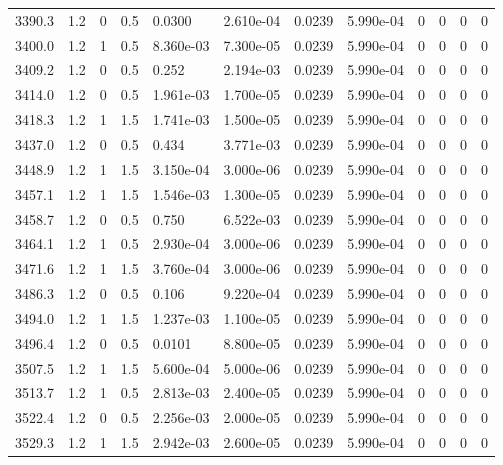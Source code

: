 \documentclass[preview]{standalone}
\begin{document}
{{{{{{{{{{{{{{\begin{tabular}{L{1.2cm}C{1.2cm} C{0.3cm}C{0.5cm} C{1.4cm}C{1.4cm} C{1.4cm}C{1.4cm} C{1.6cm}C{1.6cm} C{1.6cm}C{1.6cm}}
  3390.3  &   1.2  & 0     & 0.5 &  0.0300  & 2.610e-04  &  0.0239&   5.990e-04& 0 & 0   &  0 & 0  \\ 
  3400.0  &   1.2  & 1     & 0.5 &  8.360e-03  & 7.300e-05  &  0.0239&   5.990e-04& 0 & 0   &  0 & 0  \\ 
  3409.2  &   1.2  & 0     & 0.5 &  0.252  & 2.194e-03  &  0.0239&   5.990e-04& 0 & 0   &  0 & 0  \\ 
  3414.0  &   1.2  & 0     & 0.5 &  1.961e-03  & 1.700e-05  &  0.0239&   5.990e-04& 0 & 0   &  0 & 0  \\ 
  3418.3  &   1.2  & 1     & 1.5 &  1.741e-03  & 1.500e-05  &  0.0239&   5.990e-04& 0 & 0   &  0 & 0  \\ 
  3437.0  &   1.2  & 0     & 0.5 &  0.434  & 3.771e-03  &  0.0239&   5.990e-04& 0 & 0   &  0 & 0  \\ 
  3448.9  &   1.2  & 1     & 1.5 &  3.150e-04  & 3.000e-06  &  0.0239&   5.990e-04& 0 & 0   &  0 & 0  \\ 
  3457.1  &   1.2  & 1     & 1.5 &  1.546e-03  & 1.300e-05  &  0.0239&   5.990e-04& 0 & 0   &  0 & 0  \\ 
  3458.7  &   1.2  & 0     & 0.5 &  0.750  & 6.522e-03  &  0.0239&   5.990e-04& 0 & 0   &  0 & 0  \\ 
  3464.1  &   1.2  & 1     & 0.5 &  2.930e-04  & 3.000e-06  &  0.0239&   5.990e-04& 0 & 0   &  0 & 0  \\ 
  3471.6  &   1.2  & 1     & 1.5 &  3.760e-04  & 3.000e-06  &  0.0239&   5.990e-04& 0 & 0   &  0 & 0  \\ 
  3486.3  &   1.2  & 0     & 0.5 &  0.106  & 9.220e-04  &  0.0239&   5.990e-04& 0 & 0   &  0 & 0  \\ 
  3494.0  &   1.2  & 1     & 1.5 &  1.237e-03  & 1.100e-05  &  0.0239&   5.990e-04& 0 & 0   &  0 & 0  \\ 
  3496.4  &   1.2  & 0     & 0.5 &  0.0101  & 8.800e-05  &  0.0239&   5.990e-04& 0 & 0   &  0 & 0  \\ 
  3507.5  &   1.2  & 1     & 1.5 &  5.600e-04  & 5.000e-06  &  0.0239&   5.990e-04& 0 & 0   &  0 & 0  \\ 
  3513.7  &   1.2  & 1     & 0.5 &  2.813e-03  & 2.400e-05  &  0.0239&   5.990e-04& 0 & 0   &  0 & 0  \\ 
  3522.4  &   1.2  & 0     & 0.5 &  2.256e-03  & 2.000e-05  &  0.0239&   5.990e-04& 0 & 0   &  0 & 0  \\ 
  3529.3  &   1.2  & 1     & 1.5 &  2.942e-03  & 2.600e-05  &  0.0239&   5.990e-04& 0 & 0   &  0 & 0  \\ 

\end{tabular}}}}}}}}}}}}}}}
\end{document}
